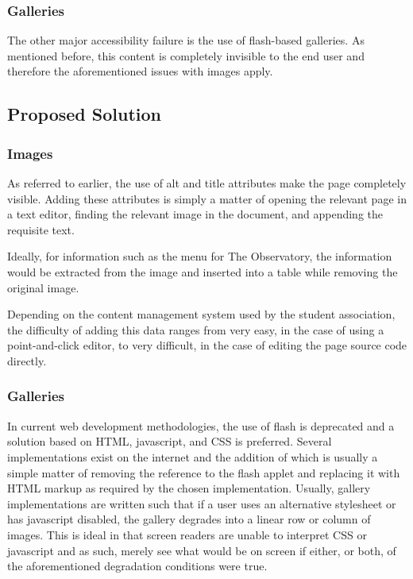 \documentclass[]{article}
\begin{document}
\subsubsection{Galleries}\label{galleries}

The other major accessibility failure is the use of flash-based
galleries. As mentioned before, this content is completely invisible to
the end user and therefore the aforementioned issues with images apply.

\subsection{Proposed Solution}\label{proposed-solution}

\subsubsection{Images}\label{images-1}

As referred to earlier, the use of alt and title attributes make the
page completely visible. Adding these attributes is simply a matter of
opening the relevant page in a text editor, finding the relevant image
in the document, and appending the requisite text.

Ideally, for information such as the menu for The Observatory, the
information would be extracted from the image and inserted into a table
while removing the original image.

Depending on the content management system used by the student
association, the difficulty of adding this data ranges from very easy,
in the case of using a point-and-click editor, to very difficult, in the
case of editing the page source code directly.

\subsubsection{Galleries}\label{galleries-1}

In current web development methodologies, the use of flash is deprecated
and a solution based on HTML, javascript, and CSS is preferred. Several
implementations exist on the internet and the addition of which is
usually a simple matter of removing the reference to the flash applet
and replacing it with HTML markup as required by the chosen
implementation. Usually, gallery implementations are written such that
if a user uses an alternative stylesheet or has javascript disabled, the
gallery degrades into a linear row or column of images. This is ideal in
that screen readers are unable to interpret CSS or javascript and as
such, merely see what would be on screen if either, or both, of the
aforementioned degradation conditions were true.
\end{document}
